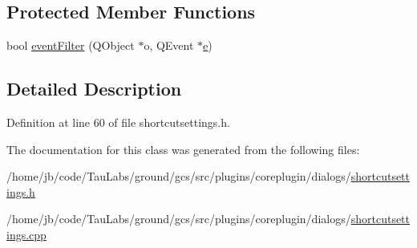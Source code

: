 \subsection*{\-Protected \-Member \-Functions}
\begin{DoxyCompactItemize}
\item 
bool \hyperlink{group___core_plugin_gadb41d92ceddef6fe4e1f259b5f640ca5}{event\-Filter} (\-Q\-Object $\ast$o, \-Q\-Event $\ast$\hyperlink{_o_p_plots_8m_a9425be9aab51621e317ba7ade564b570}{e})
\end{DoxyCompactItemize}


\subsection{\-Detailed \-Description}


\-Definition at line 60 of file shortcutsettings.\-h.



\-The documentation for this class was generated from the following files\-:\begin{DoxyCompactItemize}
\item 
/home/jb/code/\-Tau\-Labs/ground/gcs/src/plugins/coreplugin/dialogs/\hyperlink{shortcutsettings_8h}{shortcutsettings.\-h}\item 
/home/jb/code/\-Tau\-Labs/ground/gcs/src/plugins/coreplugin/dialogs/\hyperlink{shortcutsettings_8cpp}{shortcutsettings.\-cpp}\end{DoxyCompactItemize}
